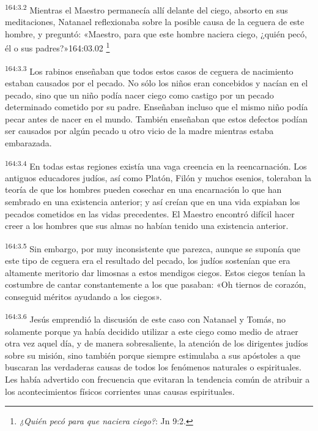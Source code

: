 \par
\textsuperscript{164:3.2} Mientras el Maestro permanecía allí delante del ciego, absorto en sus meditaciones, Natanael reflexionaba sobre la posible causa de la ceguera de este hombre, y preguntó: «Maestro, para que este hombre naciera ciego, ¿quién pecó, él o sus padres?»164:03.02 \footnote{\textit{¿Quién pecó para que naciera ciego?}: Jn 9:2.}

\par
\textsuperscript{164:3.3} Los rabinos enseñaban que todos estos casos de ceguera de nacimiento estaban causados por el pecado. No sólo los niños eran concebidos y nacían en el pecado, sino que un niño podía nacer ciego como castigo por un pecado determinado cometido por su padre. Enseñaban incluso que el mismo niño podía pecar antes de nacer en el mundo. También enseñaban que estos defectos podían ser causados por algún pecado u otro vicio de la madre mientras estaba embarazada.

\par
\textsuperscript{164:3.4} En todas estas regiones existía una vaga creencia en la reencarnación. Los antiguos educadores judíos, así como Platón, Filón y muchos esenios, toleraban la teoría de que los hombres pueden cosechar en una encarnación lo que han sembrado en una existencia anterior; y así creían que en una vida expiaban los pecados cometidos en las vidas precedentes. El Maestro encontró difícil hacer creer a los hombres que sus almas no habían tenido una existencia anterior.

\par
\textsuperscript{164:3.5} Sin embargo, por muy inconsistente que parezca, aunque se suponía que este tipo de ceguera era el resultado del pecado, los judíos sostenían que era altamente meritorio dar limosnas a estos mendigos ciegos. Estos ciegos tenían la costumbre de cantar constantemente a los que pasaban: «Oh tiernos de corazón, conseguid méritos ayudando a los ciegos».

\par
\textsuperscript{164:3.6} Jesús emprendió la discusión de este caso con Natanael y Tomás, no solamente porque ya había decidido utilizar a este ciego como medio de atraer otra vez aquel día, y de manera sobresaliente, la atención de los dirigentes judíos sobre su misión, sino también porque siempre estimulaba a sus apóstoles a que buscaran las verdaderas causas de todos los fenómenos naturales o espirituales. Les había advertido con frecuencia que evitaran la tendencia común de atribuir a los acontecimientos físicos corrientes unas causas espirituales.

